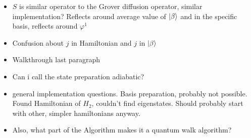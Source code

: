 %
%

\newpage
\begin{itemize}
  \item $S$ is similar operator to the Grover diffusion operator, similar implementation? Reflects around average value of $\ket{\beta}$ and in the specific basis, reflects around $\varphi^1$
  \item Confusion about $j$ in Hamiltonian and $j$ in $\ket{\beta}$
  \item Walkthrough last paragraph
  \item Can i call the state preparation adiabatic?
  \item general implementation questions. Basis preparation, probably not possible. Found Hamiltonian of $H_2$, couldn't find eigenstates. Should probably start with other, simpler hamiltonians anyway.
  \item Also, what part of the Algorithm makes it a quantum walk algorithm?
\end{itemize}
